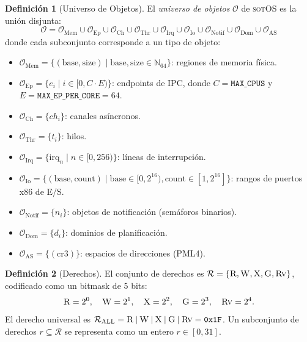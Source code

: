\documentclass[11pt,twoside,openright]{book}
\theoremstyle{definition}
\newtheorem{definition}{Definición}[chapter]
\theoremstyle{plain}
\theoremstyle{remark}
\newcommand{\sotos}{\textsc{sotOS}}
\newcommand{\rights}{\mathcal{R}}
\newcommand{\rightsall}{\rights_{\mathrm{ALL}}}
\newcommand{\bitor}{\mathbin{|}}
\begin{document}
\begin{definition}[Universo de Objetos]
\label{def:object-universe}
El \emph{universo de objetos} $\mathcal{O}$ de \sotos{} es la unión disjunta:
\[
    \mathcal{O} = \mathcal{O}_{\text{Mem}} \cup \mathcal{O}_{\text{Ep}} \cup
    \mathcal{O}_{\text{Ch}} \cup \mathcal{O}_{\text{Thr}} \cup
    \mathcal{O}_{\text{Irq}} \cup \mathcal{O}_{\text{Io}} \cup
    \mathcal{O}_{\text{Notif}} \cup \mathcal{O}_{\text{Dom}} \cup
    \mathcal{O}_{\text{AS}}
\]
donde cada subconjunto corresponde a un tipo de objeto:
\begin{itemize}
    \item $\mathcal{O}_{\text{Mem}} = \{(\text{base}, \text{size}) \mid \text{base}, \text{size} \in \mathbb{N}_{64}\}$:
          regiones de memoria física.
    \item $\mathcal{O}_{\text{Ep}} = \{e_i \mid i \in [0, C \cdot E)\}$: endpoints de IPC,
          donde $C = \texttt{MAX\_CPUS}$ y $E = \texttt{MAX\_EP\_PER\_CORE} = 64$.
    \item $\mathcal{O}_{\text{Ch}} = \{ch_i\}$: canales asíncronos.
    \item $\mathcal{O}_{\text{Thr}} = \{t_i\}$: hilos.
    \item $\mathcal{O}_{\text{Irq}} = \{\text{irq}_n \mid n \in [0, 256)\}$: líneas de interrupción.
    \item $\mathcal{O}_{\text{Io}} = \{(\text{base}, \text{count}) \mid \text{base} \in [0, 2^{16}), \text{count} \in [1, 2^{16}]\}$:
          rangos de puertos x86 de E/S.
    \item $\mathcal{O}_{\text{Notif}} = \{n_i\}$: objetos de notificación (semáforos binarios).
    \item $\mathcal{O}_{\text{Dom}} = \{d_i\}$: dominios de planificación.
    \item $\mathcal{O}_{\text{AS}} = \{(\text{cr3})\}$: espacios de direcciones (PML4).
\end{itemize}
\end{definition}

\begin{definition}[Derechos]
\label{def:rights}
El conjunto de derechos es $\rights = \{\textsc{R}, \textsc{W}, \textsc{X}, \textsc{G}, \textsc{Rv}\}$,
codificado como un bitmask de 5 bits:
\[
    \textsc{R} = 2^0, \quad
    \textsc{W} = 2^1, \quad
    \textsc{X} = 2^2, \quad
    \textsc{G} = 2^3, \quad
    \textsc{Rv} = 2^4.
\]
El derecho universal es $\rightsall = \textsc{R} \bitor \textsc{W} \bitor \textsc{X} \bitor \textsc{G} \bitor \textsc{Rv} = \texttt{0x1F}$.
Un subconjunto de derechos $r \subseteq \rights$ se representa como un entero $r \in [0, 31]$.
\end{definition}
\end{document}
